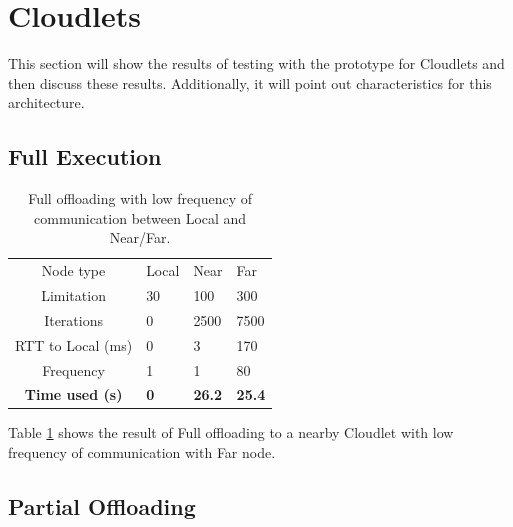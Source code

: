 

\section{Cloudlets}

This section will show the results of testing with the prototype for Cloudlets and then discuss these results. Additionally, it will point out characteristics for this architecture.


\subsection{Full Execution}


\begin{table}[h!]
    \centering
    \begin{tabular}[c]{c|p{2cm}p{2cm}p{2cm}}

        Node type & Local & Near & Far \\

        Limitation          & 30 & 100 & 300  \\

        Iterations          & 0 & 2500 & 7500  \\

        RTT to Local (ms)   & 0 & 3 & 170 \\

        Frequency           & 1 & 1 & 80 \\

        \hline
        \textbf{Time used (s)}       & \textbf{0} & \textbf{26.2} & \textbf{25.4} \\

    \end{tabular}
    \caption{Full offloading with low frequency of communication between Local and Near/Far.}
    \label{tab:Cloudlet_full_offloading_low_frequency}
\end{table}

Table \ref{tab:Cloudlet_full_offloading_low_frequency} shows the result of Full offloading to a nearby Cloudlet with low frequency of communication with Far node.







\subsection{Partial Offloading}



